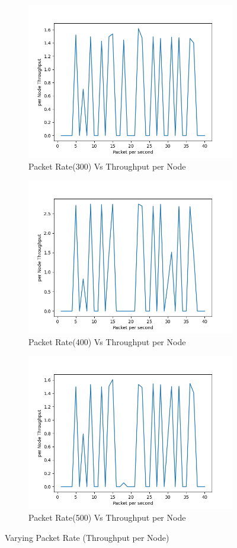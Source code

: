 \begin{figure}[h]
\begin{subfigure}{.5\textwidth}
    \includegraphics[width=.8\linewidth]{_15_4_static/Packetpersecond(300)vsperNodeThroughput.png}
         \caption{Packet Rate(300) Vs Throughput per Node}
        \end{subfigure}
\begin{subfigure}{.5\textwidth}
    \centering
    \includegraphics[width=.8\linewidth]{_15_4_static/Packetpersecond(400)vsperNodeThroughput.png}
         \caption{Packet Rate(400) Vs Throughput per Node}
        \end{subfigure}
\begin{subfigure}{.5\textwidth}
    \centering
    \includegraphics[width=.8\linewidth]{_15_4_static/Packetpersecond(500)vsperNodeThroughput.png}
         \caption{Packet Rate(500) Vs Throughput per Node}
        \end{subfigure}
\caption{Varying Packet Rate (Throughput per Node)}
\label{packet_rate_per_node_throughput}
\end{figure}

